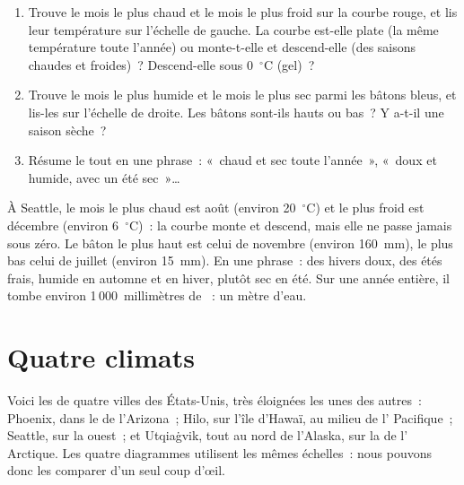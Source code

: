 \begin{method}\label{met:g5:weather-and-climate:reading}
\begin{enumerate}
  \item Trouve le mois le plus chaud et le mois le plus froid sur la courbe
        rouge, et lis leur température sur l'échelle de gauche. La courbe
        est-elle plate (la même température toute l'année) ou monte-t-elle
        et descend-elle (des saisons chaudes et froides)~? Descend-elle
        sous 0~$^\circ$C (gel)~?
  \item Trouve le mois le plus humide et le mois le plus sec parmi les
        bâtons bleus, et lis-les sur l'échelle de droite. Les bâtons
        sont-ils hauts ou bas~? Y a-t-il une saison sèche~?
  \item Résume le tout en une phrase~: «~chaud et sec toute l'année~»,
        «~doux et humide, avec un été sec~»{\ldots}
\end{enumerate}
\end{method}

\begin{example}[Seattle]\label{ex:g5:weather-and-climate:seattle}
À Seattle, le mois le plus chaud est août (environ 20~$^\circ$C) et le plus
froid est décembre (environ 6~$^\circ$C)~: la courbe monte et descend, mais
elle ne passe jamais sous zéro. Le bâton le plus haut est celui de novembre
(environ 160~mm), le plus bas celui de juillet (environ 15~mm). En une
phrase~: des hivers doux, des étés frais, humide en automne et en hiver,
plutôt sec en été. Sur une année entière, il tombe environ
1\,000~millimètres de ~: un mètre d'eau.
\end{example}

\section{Quatre climats}

Voici les  de quatre villes des États-Unis, très
éloignées les unes des autres~: Phoenix, dans le  de l'Arizona~;
Hilo, sur l'île d'Hawaï, au milieu de l' Pacifique~; Seattle, sur la
 ouest~; et Utqiaġvik, tout au nord de l'Alaska, sur la  de
l' Arctique. Les quatre diagrammes utilisent les mêmes échelles~: nous
pouvons donc les comparer d'un seul coup d'œil.

